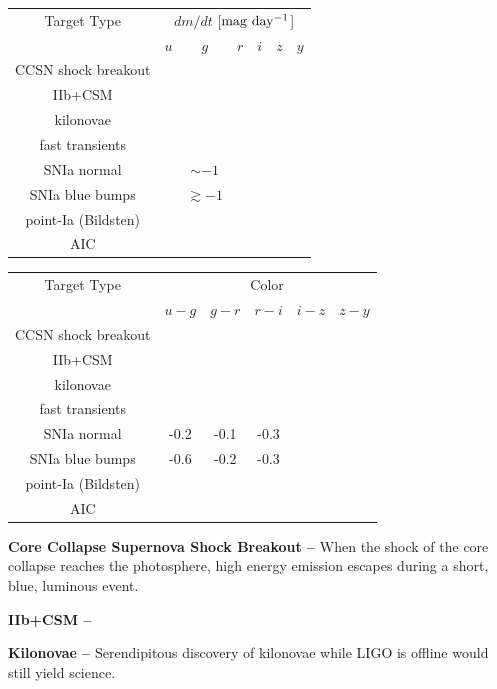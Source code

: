\documentclass[11pt]{article}
\begin{document}
\begin{center}
\label{tab:1}
\begin{tabular}{|c|cccccc|} 
\hline
Target Type & \multicolumn{6}{c|}{$dm/dt$ [$\rm mag\ day^{-1}$]} \\
  & $u$ & $g$ & $r$ & $i$ & $z$ & $y$  \\
\hline 
CCSN shock breakout &  &  &  &  &  & \\ 
IIb+CSM &  &  &  &  &  & \\ 
kilonovae &  &  &  &  &  & \\ 
fast transients &  &  &  &  &  & \\ 
SNIa normal     &  & $\sim -1$ &  &  &  &  \\
SNIa blue bumps &  & $\gtrsim -1$ &  &  &  &  \\ 
point-Ia (Bildsten) &  &  &  &  &  & \\ 
AIC &  &  &  &  &  & \\ 
\hline
\end{tabular}
\end{center}


\begin{center}
\label{tab:1}
\begin{tabular}{|c|ccccc|} 
\hline
Target Type & \multicolumn{5}{c|}{Color} \\
  & $u-g$ & $g-r$ & $r-i$ & $i-z$ & $z-y$ \\
\hline 
CCSN shock breakout  &  &  &  &  & \\ 
IIb+CSM  &  &  &  &  & \\ 
kilonovae   &  &  &  &  & \\ 
fast transients   &  &  &  &  & \\ 
SNIa normal     & -0.2 & -0.1 & -0.3 &  &  \\
SNIa blue bumps & -0.6 & -0.2 & -0.3 &  &    \\ 
point-Ia (Bildsten)  &  &  &  &  & \\ 
AIC  &  &  &  &  &  \\ 
\hline
\end{tabular}
\end{center}

{\bf Core Collapse Supernova Shock Breakout --} When the shock of the core collapse reaches the photosphere, high energy emission escapes during a short, blue, luminous event.

{\bf IIb+CSM --}

{\bf Kilonovae --} Serendipitous discovery of kilonovae while LIGO is offline would still yield science. 
\end{document}
